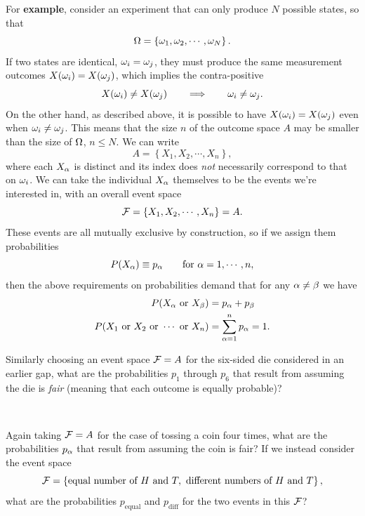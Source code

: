 For \textbf{example}, consider an experiment that can only produce $N$ possible states, so that
\begin{equation*}
  \Omega = \left\{\omega_1, \omega_2, \cdots, \omega_N\right\}.
\end{equation*}
If two states are identical, $\omega_i = \omega_j$, they must produce the same measurement outcomes $X(\omega_i) = X(\omega_j)$, which implies the contra-positive
\begin{equation*}
  X(\omega_i) \ne X(\omega_j) \qquad \Longrightarrow \qquad \omega_i \ne \omega_j.
\end{equation*}
On the other hand, as described above, it is possible to have $X(\omega_i) = X(\omega_j)$ even when $\omega_i \ne \omega_j$.
This means that the size $n$ of the outcome space $A$ may be smaller than the size of $\Omega$, $n \leq N$.
We can write
\begin{equation*}
  A = \left\{X_1, X_2, \cdots, X_n\right\},
\end{equation*}
where each $X_{\alpha}$ is distinct and its index does \textit{not} necessarily correspond to that on $\omega_i$.
We can take the individual $X_{\alpha}$ themselves to be the events we're interested in, with an overall event space
\begin{equation*}
  \mathcal F = \left\{X_1, X_2, \cdots, X_n\right\} = A.
\end{equation*}
These events are all mutually exclusive by construction, so if we assign them probabilities
\begin{equation*}
  P(X_{\alpha}) \equiv p_{\alpha} \qquad \mbox{for } \alpha = 1, \cdots, n,
\end{equation*}
then the above requirements on probabilities demand that for any $\alpha \ne \beta$ we have
\begin{align*}
  P(X_{\alpha} \mbox{ or } X_{\beta}) & = p_{\alpha} + p_{\beta} \\
  P(X_1 \hbox{ or } X_2 \hbox{ or } \cdots \mbox{ or } X_n) & = \sum_{\alpha = 1}^n p_{\alpha} = 1.
\end{align*}

Similarly choosing an event space $\mathcal F = A$ for the six-sided die considered in an earlier gap, what are the probabilities $p_1$ through $p_6$ that result from assuming the die is \textit{fair} (meaning that each outcome is equally probable)?
\begin{mdframed}
  \ \\[100 pt]
\end{mdframed}
\newpage %
\noindent Again taking $\mathcal F = A$ for the case of tossing a coin four times, what are the probabilities $p_{\alpha}$ that result from assuming the coin is fair?
If we instead consider the event space
\begin{equation*}
  \mathcal F = \left\{\mbox{equal number of } H \mbox{ and } T, \mbox{ different numbers of } H \mbox{ and } T\right\},
\end{equation*}
what are the probabilities $p_{\text{equal}}$ and $p_{\text{diff}}$ for the two events in this $\mathcal F$?
\begin{mdframed}
  \ \\[100 pt]
\end{mdframed}

